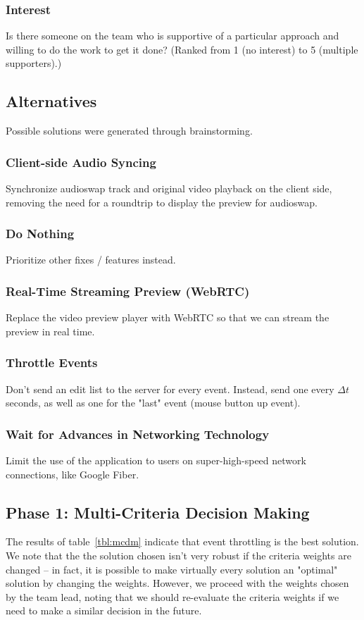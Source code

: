 \documentclass[se]{uw-wkrpt}
\begin{document}
\subsubsection{Interest}
Is there someone on the team who is supportive of a particular approach and
willing to do the work to get it done?
(Ranked from 1 (no interest) to 5 (multiple supporters).)

\subsection{Alternatives}
Possible solutions were generated through brainstorming.

\subsubsection{Client-side Audio Syncing}
Synchronize audioswap track and original video playback on the client side,
removing the need for a roundtrip to display the preview for audioswap.

\subsubsection{Do Nothing}
Prioritize other fixes / features instead.

\subsubsection{Real-Time Streaming Preview (WebRTC)}
Replace the video preview player with WebRTC so that we can stream the
preview in real time.

\subsubsection{Throttle Events}
Don't send an edit list to the server for every event. Instead, send one
every $\Delta t$ seconds, as well as one for the "last" event (mouse button up
event).

\subsubsection{Wait for Advances in Networking Technology}
Limit the use of the application to users on super-high-speed network
connections, like Google Fiber.

\subsection{Phase 1: Multi-Criteria Decision Making}
The results of table~\ref{tbl:mcdm} indicate that event throttling is the
best solution. We note that the the solution chosen isn't very robust if
the criteria weights are changed -- in fact, it is possible to make
virtually every solution an "optimal" solution by changing the weights.
However, we proceed with the weights chosen by the team lead, noting that
we should re-evaluate the criteria weights if we need to make a similar
decision in the future.
\end{document}
